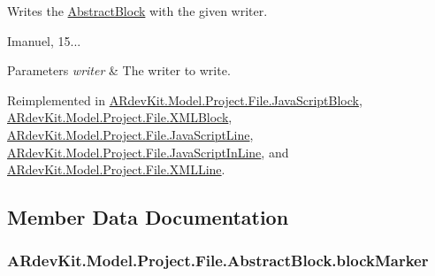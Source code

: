 Writes the \hyperlink{class_a_rdev_kit_1_1_model_1_1_project_1_1_file_1_1_abstract_block}{Abstract\-Block} with the given writer. 

Imanuel, 15... 


\begin{DoxyParams}{Parameters}
{\em writer} & The writer to write. \\
\hline
\end{DoxyParams}


Reimplemented in \hyperlink{class_a_rdev_kit_1_1_model_1_1_project_1_1_file_1_1_java_script_block_afe7251c8168c8d6062c7054bf0c21bf1}{A\-Rdev\-Kit.\-Model.\-Project.\-File.\-Java\-Script\-Block}, \hyperlink{class_a_rdev_kit_1_1_model_1_1_project_1_1_file_1_1_x_m_l_block_a93ad69ccbe004135c2cefca37e9f01db}{A\-Rdev\-Kit.\-Model.\-Project.\-File.\-X\-M\-L\-Block}, \hyperlink{class_a_rdev_kit_1_1_model_1_1_project_1_1_file_1_1_java_script_line_a9a1d47796fc64a50ccd602df70d1d562}{A\-Rdev\-Kit.\-Model.\-Project.\-File.\-Java\-Script\-Line}, \hyperlink{class_a_rdev_kit_1_1_model_1_1_project_1_1_file_1_1_java_script_in_line_a49f0664d2621cc8d5e0589c202c19b10}{A\-Rdev\-Kit.\-Model.\-Project.\-File.\-Java\-Script\-In\-Line}, and \hyperlink{class_a_rdev_kit_1_1_model_1_1_project_1_1_file_1_1_x_m_l_line_a7f58add9edb498bee39f2c09dc98c323}{A\-Rdev\-Kit.\-Model.\-Project.\-File.\-X\-M\-L\-Line}.



\subsection{Member Data Documentation}
\hypertarget{class_a_rdev_kit_1_1_model_1_1_project_1_1_file_1_1_abstract_block_a0975ceb65947c7370dcb6565677e9d0e}{
\subsubsection[{block\-Marker}]{ A\-Rdev\-Kit.\-Model.\-Project.\-File.\-Abstract\-Block.\-block\-Marker\hspace{0.3cm}{\ttfamily [protected]}}}\label{class_a_rdev_kit_1_1_model_1_1_project_1_1_file_1_1_abstract_block_a0975ceb65947c7370dcb6565677e9d0e}


